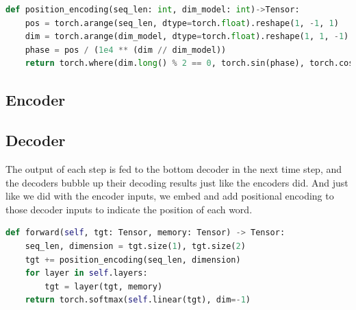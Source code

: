 \begin{lstlisting}[language=Python]
def position_encoding(seq_len: int, dim_model: int)->Tensor:
    pos = torch.arange(seq_len, dtype=torch.float).reshape(1, -1, 1)
    dim = torch.arange(dim_model, dtype=torch.float).reshape(1, 1, -1)
    phase = pos / (1e4 ** (dim // dim_model))
    return torch.where(dim.long() % 2 == 0, torch.sin(phase), torch.cos(phase))
\end{lstlisting}

\subsection{Encoder}

\subsection{Decoder}
The output of each step is fed to the bottom decoder in the next time step, and the decoders bubble up their decoding results just like the encoders did. And just like we did with the encoder inputs, we embed and add positional encoding to those decoder inputs to indicate the position of each word.

\begin{lstlisting}[language=Python]
def forward(self, tgt: Tensor, memory: Tensor) -> Tensor:
	seq_len, dimension = tgt.size(1), tgt.size(2)
	tgt += position_encoding(seq_len, dimension)
	for layer in self.layers:
		tgt = layer(tgt, memory)
	return torch.softmax(self.linear(tgt), dim=-1)
\end{lstlisting}





